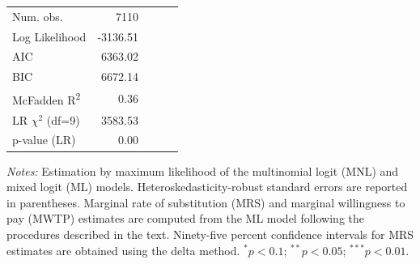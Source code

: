 \begin{table}[!htbp]
\begin{center}
\begin{scriptsize}
\begin{threeparttable}
\begin{tabular}{l D{.}{.}{4.5} D{.}{.}{2.5} c D{.}{.}{3.2}}
\midrule
Num. obs.          & 7110    &             &        &        \\
Log Likelihood     & -3136.51 &            &        &        \\
AIC                & 6363.02 &             &        &        \\
BIC                & 6672.14 &             &        &        \\
McFadden R\textsuperscript{2} & 0.36    &        &        &        \\
LR $\chi^{2}$ (df=9)          & 3583.53 &        &        &        \\
p-value (LR)       & 0.00    &             &        &        \\
\bottomrule

\end{tabular}

\begin{tablenotes}
\scriptsize
\item \textit{Notes:} Estimation by maximum likelihood of the multinomial logit (MNL) and mixed logit (ML) models. 
Heteroskedasticity-robust standard errors are reported in parentheses. 
Marginal rate of substitution (MRS) and marginal willingness to pay (MWTP) estimates are computed from the ML model following the procedures described in the text. 
Ninety-five percent confidence intervals for MRS estimates are obtained using the delta method. 
$^{*}p < 0.1$; $^{**}p < 0.05$; $^{***}p < 0.01$.
\end{tablenotes}

\end{threeparttable}
\end{scriptsize}
\label{tab:base_owner}
\end{center}
\end{table}
